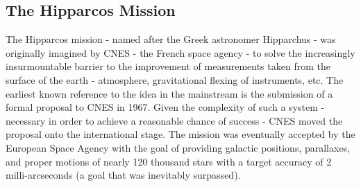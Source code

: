 \documentclass{business-covered} %
\begin{document}
		\subsection{The Hipparcos Mission}
			
			The Hipparcos mission - named after the Greek astronomer Hipparchus -  was originally imagined by CNES - the French space agency - to solve the increasingly insurmountable barrier to the improvement of measurements taken from the surface of the earth - atmosphere, gravitational flexing of instruments, etc. The earliest known reference to the idea in the mainstream is the submission of a formal proposal to CNES in 1967. Given the complexity of such a system - necessary in order to achieve a reasonable chance of success - CNES moved the proposal onto the international stage. The mission was eventually accepted by the European Space Agency with the goal of providing galactic positions, parallaxes, and proper motions of nearly 120 thousand stars with a target accuracy of 2 milli-arcseconds (a goal that was inevitably surpassed).
	
\pagebreak
\end{document}
